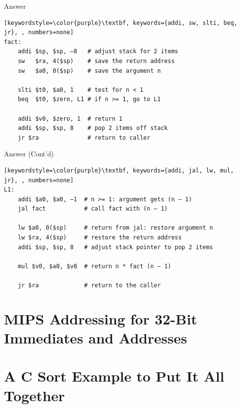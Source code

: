 \begin{frame}[fragile]{Answer}
\begin{lstlisting}[keywordstyle=\color{purple}\textbf, keywords={addi, sw, slti, beq, jr}, , numbers=none]
fact:
    addi $sp, $sp, –8   # adjust stack for 2 items
    sw   $ra, 4($sp)    # save the return address
    sw   $a0, 0($sp)    # save the argument n
    
    slti $t0, $a0, 1    # test for n < 1
    beq  $t0, $zero, L1 # if n >= 1, go to L1
    
    addi $v0, $zero, 1  # return 1
    addi $sp, $sp, 8    # pop 2 items off stack
    jr $ra              # return to caller
\end{lstlisting}
\end{frame}

\begin{frame}[fragile]{Answer (Cont'd)}
\begin{lstlisting}[keywordstyle=\color{purple}\textbf, keywords={addi, jal, lw, mul, jr}, , numbers=none]
L1: 
    addi $a0, $a0, –1  # n >= 1: argument gets (n – 1)
    jal fact           # call fact with (n – 1)

    lw $a0, 0($sp)     # return from jal: restore argument n
    lw $ra, 4($sp)     # restore the return address
    addi $sp, $sp, 8   # adjust stack pointer to pop 2 items
    
    mul $v0, $a0, $v0  # return n * fact (n – 1)

    jr $ra             # return to the caller
\end{lstlisting}
\end{frame}

\section{MIPS Addressing for 32-Bit Immediates and Addresses}
\section{A C Sort Example to Put It All Together}